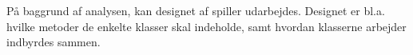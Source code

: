 På baggrund af analysen, kan designet af spiller udarbejdes. Designet er bl.a. hvilke metoder de enkelte klasser skal indeholde, samt hvordan klasserne arbejder indbyrdes sammen.





